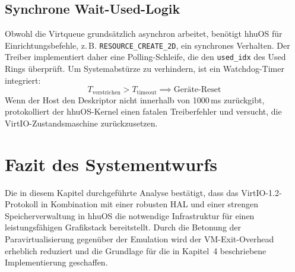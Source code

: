 \subsection{Synchrone Wait-Used-Logik}
Obwohl die Virtqueue grundsätzlich asynchron arbeitet, benötigt hhuOS für
Einrichtungsbefehle, z.\,B. \texttt{RESOURCE\_CREATE\_2D}, ein synchrones
Verhalten. Der Treiber implementiert daher eine Polling-Schleife, die den
\texttt{used\_idx} des Used Rings überprüft. Um Systemabstürze zu verhindern,
ist ein Watchdog-Timer integriert:
\begin{equation}
    T_{\text{verstrichen}} > T_{\text{timeout}} \implies \text{Geräte-Reset}
\end{equation}
Wenn der Host den Deskriptor nicht innerhalb von 1000\,ms zurückgibt,
protokolliert der hhuOS-Kernel einen fatalen Treiberfehler und versucht, die
VirtIO-Zustandsmaschine zurückzusetzen.

\section{Fazit des Systementwurfs}
Die in diesem Kapitel durchgeführte Analyse bestätigt, dass das
VirtIO-1.2-Protokoll in Kombination mit einer robusten HAL und einer strengen
Speicherverwaltung in hhuOS die notwendige Infrastruktur für einen
leistungsfähigen Grafikstack bereitstellt. Durch die Betonung der
Paravirtualisierung gegenüber der Emulation wird der VM-Exit-Overhead erheblich
reduziert und die Grundlage für die in Kapitel~4 beschriebene Implementierung
geschaffen.

\newpage